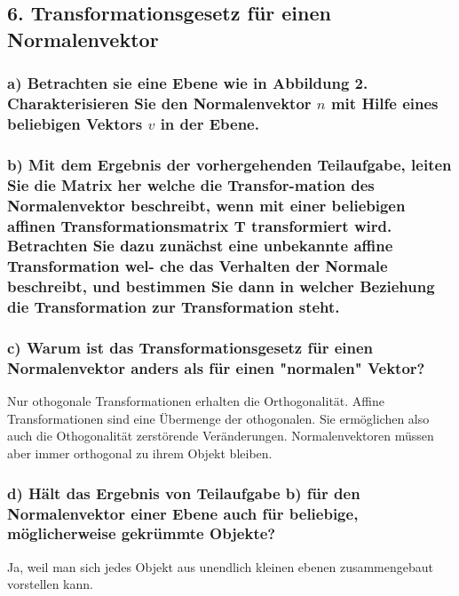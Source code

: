\documentclass[a4paper,headings=small]{scrartcl}
\numberwithin{equation}{section} %
\numberwithin{figure}{section}   %
\begin{document}
\subsection{6. Transformationsgesetz für einen Normalenvektor}

\subsubsection{a) Betrachten sie eine Ebene wie in Abbildung 2. Charakterisieren Sie den Normalenvektor $n$ mit Hilfe eines beliebigen Vektors $v$ in der Ebene.}

\subsubsection{b) Mit dem Ergebnis der vorhergehenden Teilaufgabe, leiten Sie die Matrix her welche die Transfor-mation des Normalenvektor beschreibt, wenn mit einer beliebigen affinen Transformationsmatrix
T transformiert wird. Betrachten Sie dazu zunächst eine unbekannte affine Transformation wel-
che das Verhalten der Normale beschreibt, und bestimmen Sie dann in welcher Beziehung die
Transformation zur Transformation steht.}

\subsubsection{c) Warum ist das Transformationsgesetz für einen Normalenvektor anders als für einen "normalen" Vektor?}
Nur othogonale Transformationen erhalten die Orthogonalität. Affine Transformationen sind eine Übermenge der othogonalen. Sie ermöglichen also auch die Othogonalität zerstörende Veränderungen. Normalenvektoren müssen aber immer orthogonal zu ihrem Objekt bleiben.

\subsubsection{d) Hält das Ergebnis von Teilaufgabe b) für den Normalenvektor einer Ebene auch für beliebige, möglicherweise gekrümmte Objekte?}
Ja, weil man sich jedes Objekt aus unendlich kleinen ebenen zusammengebaut vorstellen kann.
\end{document}

